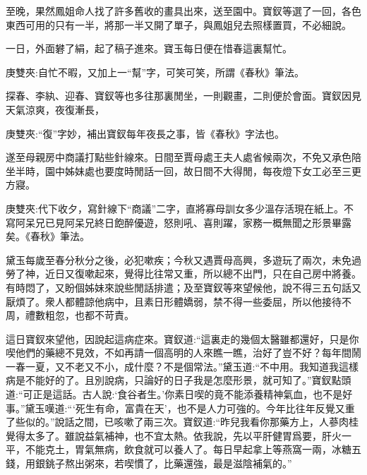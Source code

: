 \begin{parag}
    至晚，果然鳳姐命人找了許多舊收的畫具出來，送至園中。寶釵等選了一回，各色東西可用的只有一半，將那一半又開了單子，與鳳姐兒去照樣置買，不必細說。
\end{parag}


\begin{parag}
    一日，外面礬了絹，起了稿子進來。寶玉每日便在惜春這裏幫忙。\begin{note}庚雙夾:自忙不暇，又加上一“幫”字，可笑可笑，所謂《春秋》筆法。\end{note}探春、李紈、迎春、寶釵等也多往那裏閒坐，一則觀畫，二則便於會面。寶釵因見天氣涼爽，夜復漸長，\begin{note}庚雙夾:“復”字妙，補出寶釵每年夜長之事，皆《春秋》字法也。\end{note}遂至母親房中商議打點些針線來。日間至賈母處王夫人處省候兩次，不免又承色陪坐半時，園中姊妹處也要度時閒話一回，故日間不大得閒，每夜燈下女工必至三更方寢。\begin{note}庚雙夾:代下收夕，寫針線下“商議”二字，直將寡母訓女多少溫存活現在紙上。不寫阿呆兄已見阿呆兄終日飽醉優遊，怒則吼、喜則躍，家務一概無聞之形景畢露矣。《春秋》筆法。\end{note}黛玉每歲至春分秋分之後，必犯嗽疾；今秋又遇賈母高興，多遊玩了兩次，未免過勞了神，近日又復嗽起來，覺得比往常又重，所以總不出門，只在自己房中將養。有時悶了，又盼個姊妹來說些閒話排遣；及至寶釵等來望候他，說不得三五句話又厭煩了。衆人都體諒他病中，且素日形體嬌弱，禁不得一些委屈，所以他接待不周，禮數粗忽，也都不苛責。
\end{parag}


\begin{parag}
    這日寶釵來望他，因說起這病症來。寶釵道:“這裏走的幾個太醫雖都還好，只是你喫他們的藥總不見效，不如再請一個高明的人來瞧一瞧，治好了豈不好？每年間鬧一春一夏，又不老又不小，成什麼？不是個常法。”黛玉道:“不中用。我知道我這樣病是不能好的了。且別說病，只論好的日子我是怎麼形景，就可知了。”寶釵點頭道:“可正是這話。古人說:‘食谷者生。’你素日喫的竟不能添養精神氣血，也不是好事。”黛玉嘆道:“‘死生有命，富貴在天’，也不是人力可強的。今年比往年反覺又重了些似的。”說話之間，已咳嗽了兩三次。寶釵道:“昨兒我看你那藥方上，人蔘肉桂覺得太多了。雖說益氣補神，也不宜太熱。依我說，先以平肝健胃爲要，肝火一平，不能克土，胃氣無病，飲食就可以養人了。每日早起拿上等燕窩一兩，冰糖五錢，用銀銚子熬出粥來，若喫慣了，比藥還強，最是滋陰補氣的。”
\end{parag}



